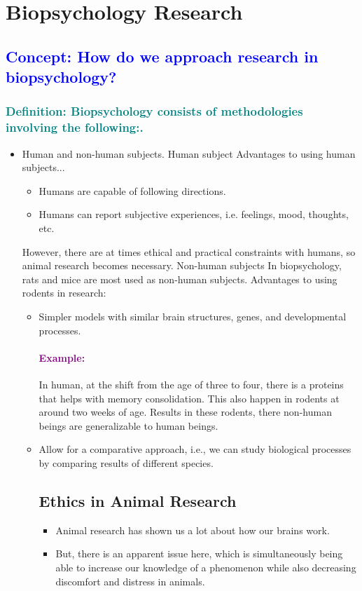 \documentclass[12pt,a4paper]{article}
\newcommand{\concept}[1]{\subsection*{\textcolor{blue}{Concept: #1}}}
\newcommand{\definition}[1]{\subsubsection*{\textcolor{teal}{Definition: #1}}}
\newcommand{\example}[1]{\paragraph{\textcolor{purple}{Example:}} #1}
\begin{document}
	\section{Biopsychology Research}
	\concept{How do we approach research in biopsychology?}
	\definition{Biopsychology consists of methodologies involving the following:.}
	\begin{itemize}
		\item Human and non-human subjects.
		\subitem Human subject
		\subsubitem Advantages to using human subjects...
		\begin{itemize}
			\item Humans are capable of following directions. 
			\item Humans can report subjective experiences, i.e. feelings, mood, thoughts, etc. 
		\end{itemize}	
		\subsubitem However, there are at times ethical and practical constraints with humans, so animal research becomes necessary.
		\subitem Non-human subjects 
		\subsubitem In biopsychology, rats and mice are most used as non-human subjects. 
		\subsubitem Advantages to using rodents in research: 
		\begin{itemize}
			\item Simpler models with similar brain structures, genes, and developmental processes. 
			\example{In human, at the shift from the age of three to four, there is a proteins that helps with memory consolidation. This also happen in rodents at around two weeks of age.}
			\subitem Results in these rodents, there non-human beings are generalizable to human beings. 
			\item Allow for a comparative approach, i.e., we can study biological processes by comparing results of different species. 
			\subsection{Ethics in Animal Research}
			\begin{itemize}
				\item Animal research has shown us a lot about how our brains work. 
				\item But, there is an apparent issue here, which is simultaneously being able to increase our knowledge of a phenomenon while also decreasing discomfort and distress in animals. 
			\end{itemize}

\end{itemize}
\end{itemize}
\end{document}
